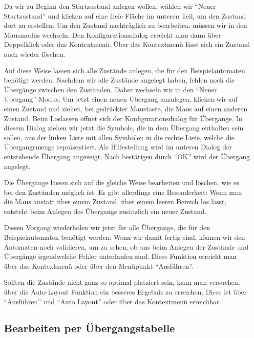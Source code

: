 Da wir zu Beginn den Startzustand anlegen wollen, wählen wir "`Neuer Startzustand"'
und klicken auf eine freie Fläche im unteren Teil, um den Zustand dort
zu erstellen. Um den Zustand nachträglich zu bearbeiten, müssen wir in den Mausmodus
wechseln. Den Konfigurationsdialog erreicht man dann über Doppelklick oder
das Kontextmenü. Über das Kontextmenü lässt sich ein Zustand auch wieder
löschen.\vspace{10pt}

Auf diese Weise lassen sich alle Zustände anlegen, die für den Beispielautomaten
benötigt werden. Nachdem wir alle Zustände angelegt haben, fehlen noch die
Übergänge zwischen den Zuständen. Daher wechseln wir in den "`Neuer Übergang"'-Modus.
Um jetzt einen neuen Übergang anzulegen, klicken wir auf einen Zustand und
ziehen, bei gedrückter Maustaste, die Maus auf einen anderen Zustand. Beim
Loslassen öffnet sich der Konfigurationsdialog für Übergänge. In diesem Dialog
ziehen wir jetzt die Symbole, die in dem Übergang enthalten sein sollen, aus der
linken Liste mit allen Symbolen in die rechte Liste, welche die Übergangsmenge
repräsentiert. Als Hilfestellung wird im unteren Dia\-log der entstehende
Übergang angezeigt. Nach bestätigen durch "`OK"' wird der Übergang
angelegt.\vspace{10pt}

Die Übergänge lassen sich auf die gleiche Weise bearbeiten und löschen, wie es
bei den Zuständen möglich ist. Es gibt allerdings eine Besonderheit: Wenn man die
Maus anstatt über einem Zustand, über einem leeren Bereich los lässt, entsteht
beim Anlegen des Übergangs zusätzlich ein neuer Zustand.\vspace{10pt}

Diesen Vorgang wiederholen wir jetzt für alle Übergänge, die
für den Beispielautomaten benötigt werden. Wenn wir damit fertig sind, können
wir den Automaten noch validieren, um zu sehen, ob uns beim Anlegen der Zustände
und Übergänge irgendwelche Fehler unterlaufen sind. Diese Funktion erreicht man
über das Kontextmenü oder über den Menüpunkt "`Ausführen"'.\vspace{10pt}

Sollten die Zustände nicht ganz so optimal platziert sein, kann man
versuchen, über die Auto-Layout Funktion ein besseres Ergebnis zu
erreichen. Diese ist über "`Ausführen"' und "`Auto Layout"' oder über
das Kontextmenü erreichbar.

\subsection{Bearbeiten per Übergangstabelle}

